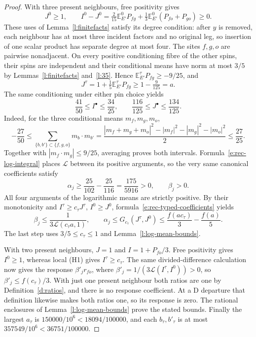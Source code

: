 \begin{proof}
With three present neighbours, free positivity gives
\[
 J^0\ge1,\qquad
 I^0-J^0=\tfrac2{15}\mathbb E^0_{E'}P_{fg}
             +\tfrac13\mathbb E^0_{E'}(P_{fo}+P_{go})\ge0.
\]
These uses of Lemma~\ref{l:finitefacts} satisfy its degree
condition: after \(y\) is removed, each neighbour has at most
three incident factors and no original leg, so insertion of one
scalar product has separate degree at most four.  The sites
\(f,g,o\) are pairwise nonadjacent.  On every positive
conditioning fibre of the other spins, their spins are independent
and their conditional means have norm at most \(3/5\) by
Lemmas~\ref{l:finitefacts} and~\ref{l:35}.  Hence
\(\mathbb E^\tau_{E'}P_{fg}\ge-9/25\), and
\[
 J^\tau=1+\tfrac15\mathbb E^\tau_{E'}P_{fg}
          \ge1-\tfrac9{125}=a.
\]
The same conditioning under either pin choice yields
\[
 \frac{41}{50}\le I^\bullet\le\frac{34}{25},\qquad
 \frac{116}{125}\le J^\bullet\le\frac{134}{125}.
\]
Indeed, for the three conditional means \(m_f,m_g,m_o\),
\[
 -\frac{27}{50}\le
 \sum_{\{b,b'\}\subset\{f,g,o\}}m_b\cdot m_{b'}
 =\frac{|m_f+m_g+m_o|^2-|m_f|^2-|m_g|^2-|m_o|^2}{2}
 \le\frac{27}{25}.
\]
Together with \(|m_f\cdot m_g|\le9/25\), averaging proves
both intervals.  Formula~\eqref{e:rec-log-integral} places
\(\mathcal L\) between its positive arguments, so the very same
canonical coefficients satisfy
\[
 \alpha_j\ge\frac{25}{102}-\frac{25}{116}
              =\frac{175}{5916}>0,\qquad \beta_j>0.
\]
All four arguments of the logarithmic means are strictly positive.
By their monotonicity and \(I^\tau\ge c_\tau J^\tau\),
\(I^0\ge J^0\), formula~\eqref{e:rec-typed-coefficients} yields
\[
 \beta_j\le\frac1{3\mathcal L(c_\tau a,1)},\qquad
 \alpha_j\le G_{c_\tau}(J^\tau,J^0)
        \le\frac{f(ac_\tau)}3-\frac{f(a)}5.
\]
The last step uses \(3/5\le c_\tau\le1\) and
Lemma~\ref{l:log-mean-bounds}.

With two present neighbours, \(J=1\) and
\(I=1+P_{fo}/3\).  Free positivity gives \(I^0\ge1\),
whereas local (H1) gives \(I^\tau\ge c_\tau\).
The same divided-difference calculation now gives the response
\(\beta'_jr_{fo}\), where
\(\beta'_j=1/(3\mathcal L(I^\tau,I^0))>0\), so
\(\beta'_j\le f(c_\tau)/3\).  With just one present neighbour
both ratios are one by Definition~\ref{d:ratios}, and there is
no response coefficient.  At a \(\mathrm D\) departure that
definition likewise makes both ratios one, so its response is zero.
The rational enclosures of Lemma~\ref{l:log-mean-bounds} prove
the stated bounds.  Finally the largest \(a_\tau\) is
\(150000/10^6<18094/100000\), and each \(b_\tau,b'_\tau\)
is at most \(357549/10^6<36751/100000\).
\end{proof}

